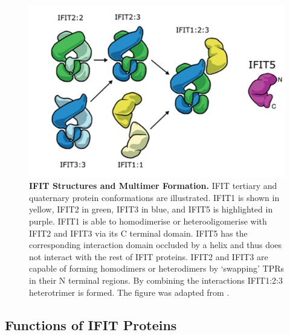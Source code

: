 \begin{figure}
    \centering
    \includegraphics[width=0.75\linewidth]{04. Introduction//Figs/IFIT-complexes.png}
    \caption[IFIT Structures and Multimer Formation.]{\textbf{IFIT Structures and Multimer Formation.} IFIT tertiary and quaternary protein conformations are illustrated. IFIT1 is shown in yellow, IFIT2 in green, IFIT3 in blue, and IFIT5 is highlighted in purple. IFIT1 is able to homodimerise or heterooligomerise with IFIT2 and IFIT3 via its C terminal domain. IFIT5 has the corresponding interaction domain occluded by a helix and thus does not interact with the rest of IFIT proteins. IFIT2 and IFIT3 are capable of forming homodimers or heterodimers by ‘swapping’ TPRs in their N terminal regions. By combining the interactions IFIT1:2:3 heterotrimer is formed. The figure was adapted from \cite{Mears2018BetterResponse}.}
    \label{fig:IFIT Structures and Multimer Formation.}
\end{figure}




\subsection{Functions of IFIT Proteins} \label{subsec:Functions of IFIT Proteins}
